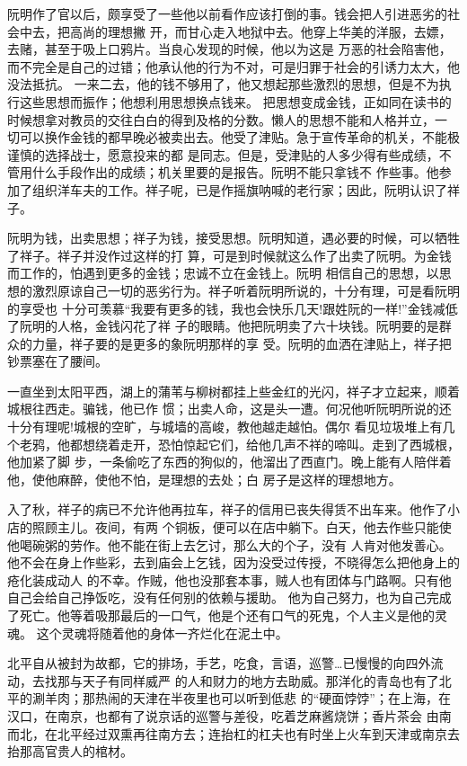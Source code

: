 \documentclass[11pt,a4paper,onecolumn]{article}
\begin{document}
阮明作了官以后，颇享受了一些他以前看作应该打倒的事。钱会把人引进恶劣的社会中去，把高尚的理想撇
开，而甘心走入地狱中去。他穿上华美的洋服，去嫖，去赌，甚至于吸上口鸦片。当良心发现的时候，他以为这是
万恶的社会陷害他，而不完全是自己的过错；他承认他的行为不对，可是归罪于社会的引诱力太大，他没法抵抗。
一来二去，他的钱不够用了，他又想起那些激烈的思想，但是不为执行这些思想而振作；他想利用思想换点钱来。
把思想变成金钱，正如同在读书的时候想拿对教员的交往白白的得到及格的分数。懒人的思想不能和人格并立，一
切可以换作金钱的都早晚必被卖出去。他受了津贴。急于宣传革命的机关，不能极谨慎的选择战士，愿意投来的都
是同志。但是，受津贴的人多少得有些成绩，不管用什么手段作出的成绩；机关里要的是报告。阮明不能只拿钱不
作些事。他参加了组织洋车夫的工作。祥子呢，已是作摇旗呐喊的老行家；因此，阮明认识了祥子。

阮明为钱，出卖思想；祥子为钱，接受思想。阮明知道，遇必要的时候，可以牺牲了祥子。祥子并没作过这样的打
算，可是到时候就这么作了\myrule 出卖了阮明。为金钱而工作的，怕遇到更多的金钱；忠诚不立在金钱上。阮明
相信自己的思想，以思想的激烈原谅自己一切的恶劣行为。祥子听着阮明所说的，十分有理，可是看阮明的享受也
十分可羡慕\myrule ``我要有更多的钱，我也会快乐几天!跟姓阮的一样!''金钱减低了阮明的人格，金钱闪花了祥
子的眼睛。他把阮明卖了六十块钱。阮明要的是群众的力量，祥子要的是更多的\myrule 象阮明那样的\myrule 享
受。阮明的血洒在津贴上，祥子把钞票塞在了腰间。

一直坐到太阳平西，湖上的蒲苇与柳树都挂上些金红的光闪，祥子才立起来，顺着城根往西走。骗钱，他已作
惯；出卖人命，这是头一遭。何况他听阮明所说的还十分有理呢!城根的空旷，与城墙的高峻，教他越走越怕。偶尔
看见垃圾堆上有几个老鸦，他都想绕着走开，恐怕惊起它们，给他几声不祥的啼叫。走到了西城根，他加紧了脚
步，一条偷吃了东西的狗似的，他溜出了西直门。晚上能有人陪伴着他，使他麻醉，使他不怕，是理想的去处；白
房子是这样的理想地方。

入了秋，祥子的病已不允许他再拉车，祥子的信用已丧失得赁不出车来。他作了小店的照顾主儿。夜间，有两
个铜板，便可以在店中躺下。白天，他去作些只能使他喝碗粥的劳作。他不能在街上去乞讨，那么大的个子，没有
人肯对他发善心。他不会在身上作些彩，去到庙会上乞钱，因为没受过传授，不晓得怎么把他身上的疮化装成动人
的不幸。作贼，他也没那套本事，贼人也有团体与门路啊。只有他自己会给自己挣饭吃，没有任何别的依赖与援助。
他为自己努力，也为自己完成了死亡。他等着吸那最后的一口气，他是个还有口气的死鬼，个人主义是他的灵魂。
这个灵魂将随着他的身体一齐烂化在泥土中。

北平自从被封为故都，它的排场，手艺，吃食，言语，巡警\ldots 已慢慢的向四外流动，去找那与天子有同样威严
的人和财力的地方去助威。那洋化的青岛也有了北平的涮羊肉；那热闹的天津在半夜里也可以听到低悲
的``硬面\myrule 饽饽''；在上海，在汉口，在南京，也都有了说京话的巡警与差役，吃着芝麻酱烧饼；香片茶会
由南而北，在北平经过双熏再往南方去；连抬杠的杠夫也有时坐上火车到天津或南京去抬那高官贵人的棺材。
\end{document}
